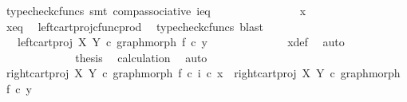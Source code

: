\begin{isabellebody}
\ {\isacharparenleft}{\kern0pt}typecheck{\isacharunderscore}{\kern0pt}cfuncs{\isacharcomma}{\kern0pt}\ smt\ comp{\isacharunderscore}{\kern0pt}associative{}\ i{\isacharunderscore}{\kern0pt}eq{\isacharparenright}{\kern0pt}\isanewline
\ \ \ \ \ \ \ \ \ \ \isamarkupfalse%
\ \isamarkupfalse%
\ {\isachardoublequoteopen}{\isachardot}{\kern0pt}{\isachardot}{\kern0pt}{\isachardot}{\kern0pt}\ {\isacharequal}{\kern0pt}\ x{\isachardoublequoteclose}\isanewline
\ \ \ \ \ \ \ \ \ \ \ \ \isamarkupfalse%
\ x{\isacharprime}{\kern0pt}{\isacharunderscore}{\kern0pt}eq\ \isamarkupfalse%
\ left{\isacharunderscore}{\kern0pt}cart{\isacharunderscore}{\kern0pt}proj{\isacharunderscore}{\kern0pt}cfunc{\isacharunderscore}{\kern0pt}prod\ \isamarkupfalse%
\ {\isacharparenleft}{\kern0pt}typecheck{\isacharunderscore}{\kern0pt}cfuncs{\isacharcomma}{\kern0pt}\ blast{\isacharparenright}{\kern0pt}\isanewline
\ \ \ \ \ \ \ \ \ \ \isamarkupfalse%
\ \isamarkupfalse%
\ {\isachardoublequoteopen}{\isachardot}{\kern0pt}{\isachardot}{\kern0pt}{\isachardot}{\kern0pt}\ {\isacharequal}{\kern0pt}\ left{\isacharunderscore}{\kern0pt}cart{\isacharunderscore}{\kern0pt}proj\ X\ Y\ {\isasymcirc}\isactrlsub c\ graph{\isacharunderscore}{\kern0pt}morph\ f\ {\isasymcirc}\isactrlsub c\ y{\isacharprime}{\kern0pt}{\isachardoublequoteclose}\isanewline
\ \ \ \ \ \ \ \ \ \ \ \ \isamarkupfalse%
\ x{\isacharunderscore}{\kern0pt}def\ \isamarkupfalse%
\ auto\isanewline
\ \ \ \ \ \ \ \ \ \ \isamarkupfalse%
\ \isamarkupfalse%
\ {\isacharquery}{\kern0pt}thesis\ \isamarkupfalse%
\ calculation\ \isamarkupfalse%
\ auto\isanewline
\ \ \ \ \ \ \ \ \isamarkupfalse%
\isanewline
\isanewline
\ \ \ \ \ \ \ \ \isamarkupfalse%
\ {\isachardoublequoteopen}right{\isacharunderscore}{\kern0pt}cart{\isacharunderscore}{\kern0pt}proj\ X\ Y\ {\isasymcirc}\isactrlsub c\ graph{\isacharunderscore}{\kern0pt}morph\ f\ {\isasymcirc}\isactrlsub c\ i\ {\isasymcirc}\isactrlsub c\ x{\isacharprime}{\kern0pt}\ {\isacharequal}{\kern0pt}\ right{\isacharunderscore}{\kern0pt}cart{\isacharunderscore}{\kern0pt}proj\ X\ Y\ {\isasymcirc}\isactrlsub c\ graph{\isacharunderscore}{\kern0pt}morph\ f\ {\isasymcirc}\isactrlsub c\ y{\isacharprime}{\kern0pt}{\isachardoublequoteclose}\isanewline
\ \ \ \ \ \ \ \ \isamarkupfalse%
\ {\isacharminus}{\kern0pt}\isanewline
\ \ \ \ \ \ \ \ \ \ \isamarkupfalse%

\end{isabellebody}

